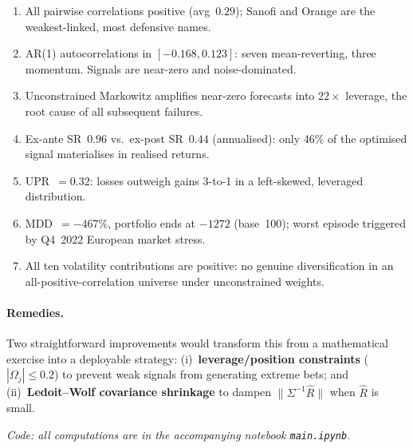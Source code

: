 \documentclass[10pt, a4paper]{article}
\begin{document}
\begin{enumerate}[leftmargin=2em,label=(\roman*),itemsep=1pt,topsep=2pt]
  \item All pairwise correlations positive (avg~$0.29$); Sanofi and Orange are the
        weakest-linked, most defensive names.
  \item AR(1) autocorrelations in $[-0.168, 0.123]$: seven mean-reverting, three momentum.
        Signals are near-zero and noise-dominated.
  \item Unconstrained Markowitz amplifies near-zero forecasts into $22\times$ leverage,
        the root cause of all subsequent failures.
  \item Ex-ante SR~$0.96$ vs.\ ex-post SR~$0.44$ (annualised): only 46\% of the
        optimised signal materialises in realised returns.
  \item UPR~$= 0.32$: losses outweigh gains 3-to-1 in a left-skewed, leveraged distribution.
  \item MDD~$= -467\%$, portfolio ends at $-1272$ (base~100); worst episode triggered
        by Q4~2022 European market stress.
  \item All ten volatility contributions are positive: no genuine diversification in an
        all-positive-correlation universe under unconstrained weights.
\end{enumerate}

\paragraph{Remedies.}
Two straightforward improvements would transform this from a mathematical exercise into
a deployable strategy: (i)~\textbf{leverage/position constraints} ($|\Omega_j|\le 0.2$)
to prevent weak signals from generating extreme bets; and (ii)~\textbf{Ledoit--Wolf
covariance shrinkage} to dampen $\|\Sigma^{-1}\hat{R}\|$ when $\hat{R}$ is small.

\smallskip\noindent
\textit{Code: all computations are in the accompanying notebook \texttt{main.ipynb}.}
\end{document}
